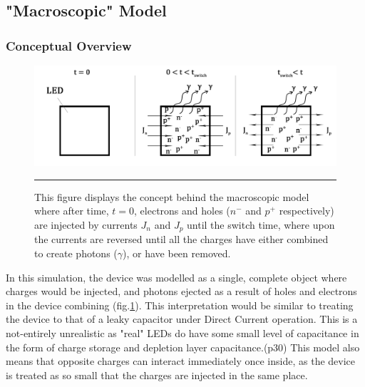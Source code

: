 \documentclass[titlepage]{article}
\begin{document}
\subsection{"Macroscopic" Model}
\subsubsection{Conceptual Overview}
\begin{figure}[H]
	\centering
	\includegraphics[scale=0.12]{Figures/Bucket_overview}
	\caption{\label{fig:bucketOverview}This figure displays the concept behind the macroscopic model where after time, $t=0$, electrons and holes ($n^-$ and $p^+$ respectively) are injected by currents $J_n$ and $J_p$ until the switch time, where upon the currents are reversed until all the charges have either combined to create photons ($\gamma$), or have been removed.}
	\hrule
\end{figure}
In this simulation, the device was modelled as a single, complete object where charges would be injected, and photons ejected as a result of holes and electrons in the device combining (fig.\ref{fig:bucketOverview}). This interpretation would be similar to treating the device to that of a leaky capacitor under Direct Current operation. This is a not-entirely unrealistic as "real" LEDs do have some small level of capacitance in the form of charge storage and  depletion layer capacitance.\cite{Veledar}(p30) This model also means that opposite charges can interact immediately once inside, as the device is treated as so small that the charges are injected in the same place.\\
\end{document}
